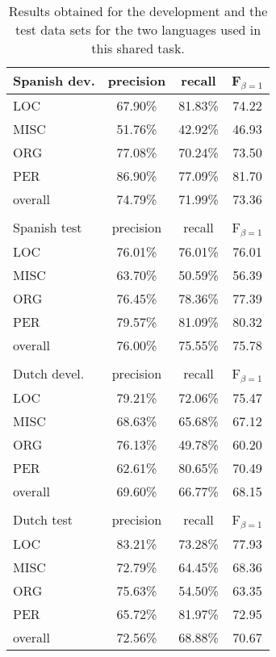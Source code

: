 \documentclass[10pt]{article}
\begin{document}
\begin{table}[t]
\begin{center}
\begin{tabular}{|l|c|c|c|}\cline{2-4}
\multicolumn{1}{l|}{Spanish dev.}
                 & precision & recall & F$_{\beta=1}$ \\\hline
LOC     & 67.90\% & 81.83\% & 74.22 \\
MISC    & 51.76\% & 42.92\% & 46.93 \\
ORG     & 77.08\% & 70.24\% & 73.50 \\
PER     & 86.90\% & 77.09\% & 81.70 \\\hline
overall & 74.79\% & 71.99\% & 73.36 \\\hline
\multicolumn{4}{c}{}\\\cline{2-4}
\multicolumn{1}{l|}{Spanish test}
                 & precision & recall & F$_{\beta=1}$ \\\hline
LOC     & 76.01\% & 76.01\% & 76.01 \\
MISC    & 63.70\% & 50.59\% & 56.39 \\
ORG     & 76.45\% & 78.36\% & 77.39 \\
PER     & 79.57\% & 81.09\% & 80.32 \\\hline
overall & 76.00\% & 75.55\% & 75.78 \\\hline
\multicolumn{4}{c}{}\\\cline{2-4}
\multicolumn{1}{l|}{Dutch devel.}
                 & precision & recall & F$_{\beta=1}$ \\\hline
LOC     & 79.21\% & 72.06\% & 75.47 \\
MISC    & 68.63\% & 65.68\% & 67.12 \\
ORG     & 76.13\% & 49.78\% & 60.20 \\
PER     & 62.61\% & 80.65\% & 70.49 \\\hline
overall & 69.60\% & 66.77\% & 68.15 \\\hline
\multicolumn{4}{c}{}\\\cline{2-4}
\multicolumn{1}{l|}{Dutch test}
                 & precision & recall & F$_{\beta=1}$ \\\hline
LOC     & 83.21\% & 73.28\% & 77.93 \\
MISC    & 72.79\% & 64.45\% & 68.36 \\
ORG     & 75.63\% & 54.50\% & 63.35 \\
PER     & 65.72\% & 81.97\% & 72.95 \\\hline
overall & 72.56\% & 68.88\% & 70.67 \\\hline
\end{tabular}
\end{center}
\caption{
Results obtained for the development and the test data sets for the
two languages used in this shared task.
} 
\label{tab-final}
\end{table}
\end{document}
